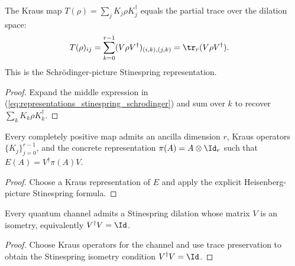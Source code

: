 \begin{theorem}\label{thm:stinespring_schrodinger_representation}
    \leanok
    The Kraus map $T(\rho)=\sum_jK_j\rho K_j^\dagger$ equals
    the partial trace over the dilation space:
    \begin{align}
        T(\rho)_{ij}
        &=\sum_{k=0}^{r-1}(V\rho V^\dagger)_{(i,k),(j,k)}
          =\tr_r(V\rho V^\dagger).
        \label{eq:representations_stinespring_schrodinger}
    \end{align}
    This is the Schr\"odinger-picture Stinespring representation.
\end{theorem}

\begin{proof}
    \leanok
    Expand the middle expression in
    (\ref{eq:representations_stinespring_schrodinger}) and sum over $k$ to
    recover $\sum_kK_k\rho K_k^\dagger$.
\end{proof}

\begin{theorem}
    \label{thm:exists_stinespring_dilation}
    \leanok
    Every completely positive map admits an ancilla dimension $r$, Kraus operators
    $\{K_j\}_{j=0}^{r-1}$, and the concrete representation
    $\pi(A)=A\otimes\Id_r$ such that $E(A)=V^\dagger\pi(A)V$.
\end{theorem}

\begin{proof}\leanok
    Choose a Kraus representation of $E$ and apply the explicit Heisenberg-picture
    Stinespring formula.
\end{proof}

\begin{theorem}
    \label{thm:exists_stinespring_isometry_of_cptp}
    \leanok
    Every quantum channel admits a Stinespring dilation whose matrix $V$ is an
    isometry, equivalently $V^\dagger V=\Id$.
\end{theorem}

\begin{proof}\leanok
    Choose Kraus operators for the channel and use trace preservation to obtain
    the Stinespring isometry condition $V^\dagger V=\Id$.
\end{proof}

